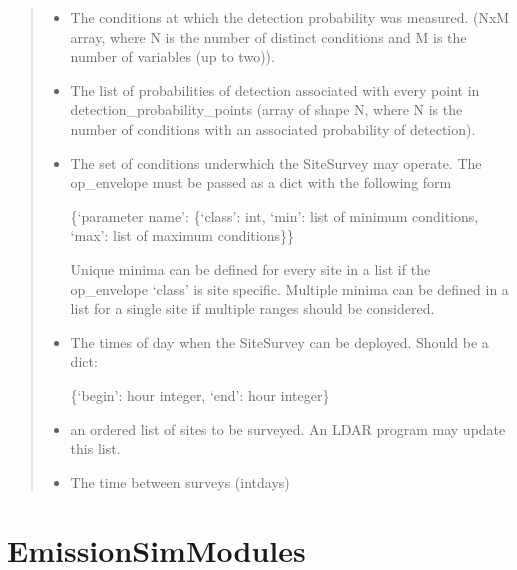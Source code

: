 \documentclass[letterpaper,10pt,english]{sphinxmanual}
\begin{document}
\begin{fulllineitems}
\begin{quote}
\begin{description}
\begin{itemize}
\item {} 
 \textendash{} The conditions at which the detection probability was measured. (NxM
array, where N is the number of distinct conditions and M is the number of variables (up to two)).

\item {} 
 \textendash{} The list of probabilities of detection associated with every point in
detection\_probability\_points (array of shape N, where N is the number of conditions with an associated
probability of detection).

\item {} 
 \textendash{} 
The set of conditions underwhich the SiteSurvey may operate. The op\_envelope must be
passed as a dict with the following form\textendash{}

\{‘parameter name’: \{‘class’: int, ‘min’: list of minimum conditions, ‘max’: list of maximum conditions\}\}

Unique minima can be defined for every site in a list if the op\_envelope ‘class’ is site specific. Multiple
minima can be defined in a list for a single site if multiple ranges should be considered.


\item {} 
 \textendash{} 
The times of day when the SiteSurvey can be deployed. Should be a dict:

\{‘begin’: hour integer, ‘end’: hour integer\}


\item {} 
 \textendash{} an ordered list of sites to be surveyed. An LDAR program may update this list.

\item {} 
 \textendash{} The time between surveys (int\textendash{}days)

\end{itemize}

\end{description}\end{quote}

\end{fulllineitems}



\section{EmissionSimModules}
\label{\detokenize{index:emissionsimmodules}}
\end{document}
